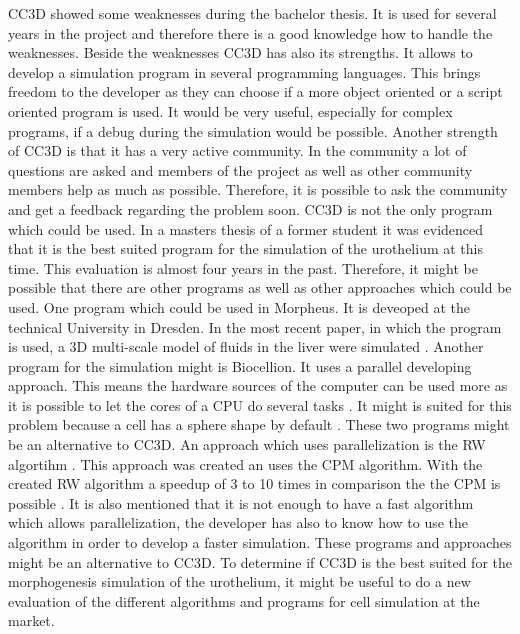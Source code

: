 \ac{CC3D} showed some weaknesses during the bachelor thesis. It is used for several years in the project and therefore there is a good knowledge how to handle the weaknesses. Beside the weaknesses \ac{CC3D} has also its strengths. It allows to develop a simulation program in several programming languages.  This brings freedom to the developer as they can choose if a more object oriented or a script oriented program is used. It would be very useful, especially for complex programs, if a debug during the simulation would be possible. Another strength of \ac{CC3D} is that it has a very active community. In the community a lot of questions are asked and members of the project as well as other community members help as much as possible. Therefore, it is possible to ask the community and get a feedback regarding the problem soon. \newline
\ac{CC3D} is not the only program which could be used. In a masters thesis of a former student it was evidenced that it is the best suited program for the simulation of the urothelium \cite{MSCAngelo} at this time. This evaluation is almost four years in the past. Therefore, it might be possible that there are other programs as well as other approaches which could be used. One program which could be used in Morpheus. It is deveoped at the technical University in Dresden. In the most recent paper, in which the program is used, a 3D multi-scale model of fluids in the liver were simulated \cite{Meyer2017}. Another program for the simulation might is Biocellion. It uses a parallel developing approach. This means the hardware sources of the computer can be used more as it is possible to let the cores of a CPU do several tasks \cite{Kang2014}. It might is suited for this problem because a cell has a sphere shape by default \cite{Kang2014}. These two programs might be an alternative to \ac{CC3D}. \newline
An approach which uses parallelization is the \ac{RW} algortihm \cite{Cercato2006}. This approach was created an uses the \ac{CPM} algorithm. With the created \ac{RW} algorithm a speedup of 3 to 10 times in comparison the the \ac{CPM} is possible \cite{Cercato2006}. It is also mentioned that it is not enough to have a fast algorithm which allows parallelization, the developer has also to know how to use the algorithm in order to develop a faster simulation. \newline
These programs and approaches might be an alternative to \ac{CC3D}. To determine if \ac{CC3D} is the best suited for the morphogenesis simulation of the urothelium, it might be useful to do a new evaluation of the different algorithms and programs for cell simulation at the market.


